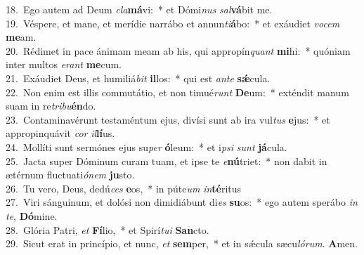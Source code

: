 {18.~}Ego autem ad Deum \textit{cla}\textbf{má}vi:~* et Dómi\textit{nus} \textit{sal}\textbf{vá}bit me.\\
{19.~}Véspere, et mane, et merídie narrábo et annun\textit{ti}\textbf{á}bo:~* et exáudiet \textit{vo}\textit{cem} \textbf{me}am.\\
{20.~}Rédimet in pace ánimam meam ab his, qui appropín\textit{quant} \textbf{mi}hi:~* quóniam inter multos \textit{e}\textit{rant} \textbf{me}cum.\\
{21.~}Exáudiet Deus, et humiliá\textit{bit} \textbf{il}los:~* qui est \textit{an}\textit{te} \textbf{sǽ}cula.\\
{22.~}Non enim est illis commutátio, et non timué\textit{runt} \textbf{De}um:~* exténdit manum suam in re\textit{tri}\textit{bu}\textbf{én}do.\\
{23.~}Contaminavérunt testaméntum ejus, divísi sunt ab ira vul\textit{tus} \textbf{e}jus:~* et appropinquávit \textit{cor} \textit{il}\textbf{lí}us.\\
{24.~}Mollíti sunt sermónes ejus su\textit{per} \textbf{ó}leum:~* et i\textit{psi} \textit{sunt} \textbf{já}cula.\\
{25.~}Jacta super Dóminum curam tuam, et ipse te \textit{e}\textbf{nú}triet:~* non dabit in ætérnum fluctuati\textit{ó}\textit{nem} \textbf{ju}sto.\\
{26.~}Tu vero, Deus, dedú\textit{ces} \textbf{e}os,~* in púte\textit{um} \textit{in}\textbf{té}ritus\\
{27.~}Viri sánguinum, et dolósi non dimidiábunt di\textit{es} \textbf{su}os:~* ego autem sperábo \textit{in} \textit{te}, \textbf{Dó}mine.\\
{28.~}Glória Patri, \textit{et} \textbf{Fí}lio,~* et Spirí\textit{tu}\textit{i} \textbf{San}cto.\\
{29.~}Sicut erat in princípio, et nunc, \textit{et} \textbf{sem}per,~* et in sǽcula sæcu\textit{ló}\textit{rum}. \textbf{A}men.\\
